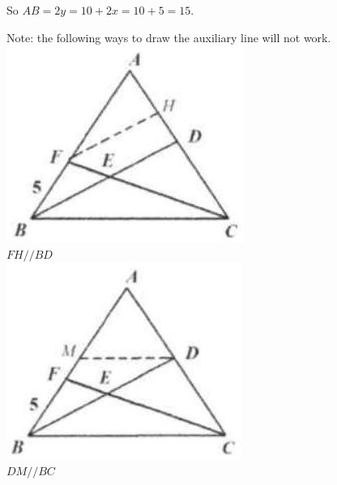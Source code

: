 \documentclass{article}
\begin{document}
So \(A B=2 y=10+2 x=10+5=15\).

Note: the following ways to draw the auxiliary line will not work.\\
\centering
\includegraphics[width=\textwidth]{images/103.jpg}\\
\(F H / / B D\)\\
\centering
\includegraphics[width=\textwidth]{images/103(5).jpg}\\
\(D M / / B C\)\\
\centering
\end{document}
